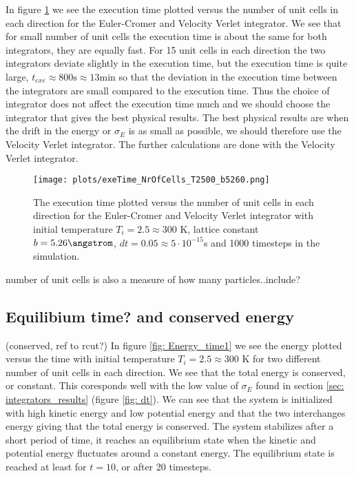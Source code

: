 \documentclass[11pt,a4wide]{article}
\begin{document}
In figure \ref{fig: exe_cells} we see the execution time plotted versus the number of unit cells in each direction for the Euler-Cromer and Velocity Verlet integrator. We see that for small number of unit cells the execution time is about the same for both integrators, they are equally fast. For 15 unit cells in each direction the two integrators deviate slightly in the execution time, but the execution time is quite large, $t_{exe} \approx 800 \mathrm{s} \approx 13 \mathrm{min}$ so that the deviation in the execution time between the integrators are small compared to the execution time. Thus the choice of integrator does not affect the execution time much and we should choose the integrator that gives the best physical results. The best physical results are when the drift in the energy or $\sigma_E$ is as small as possible, we should therefore use the Velocity Verlet integrator. The further calculations are done with the Velocity Verlet integrator. 

\begin{figure}[htp]
\centering
\texttt{[image: plots/exeTime\_NrOfCells\_T2500\_b5260.png]}
\caption{The execution time plotted versus the number of unit cells in each direction for the Euler-Cromer and Velocity Verlet integrator with initial temperature $T_i = 2.5 \approx 300$ K, lattice constant $b=5.26 \angstrom$, $dt=0.05\approx  5\cdot 10^{-15}$s and 1000 timesteps in the simulation.}
\label{fig: exe_cells}
\end{figure}

number of unit cells is also a measure of how many particles..include?


\subsection{Equilibium time? and conserved energy}
(conserved, ref to rcut?)
In figure \ref{fig: Energy_time1} we see the energy plotted versus the time with initial temperature $T_i = 2.5 \approx 300$ K for two different number of unit cells in each direction. We see that the total energy is conserved, or constant. This coresponds well with the low value of $\sigma_E$ found in section \ref{sec: integrators_results} (figure \ref{fig: dt}). We can see that the system is initialized with high kinetic energy and low potential energy and that the two interchanges energy giving that the total energy is conserved. The system stabilizes after a short period of time, it reaches an equilibrium state when the kinetic and potential energy fluctuates around a constant energy. The equilibrium state is reached at least for $t=10$, or after 20 timesteps. 
\end{document}
